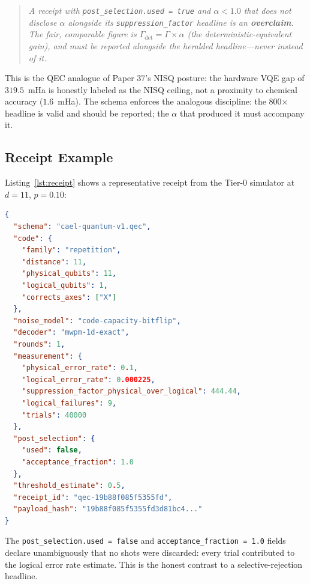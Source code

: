 \documentclass[conference]{IEEEtran}
\providecommand{\measuredFrom}[1]{}
\newcommand{\af}{\alpha}            %
\newcommand{\suppfactor}{\Gamma}    %
\begin{document}
\begin{quote}
\textit{A receipt with \texttt{post\_selection.used = true} and
$\af < 1.0$ that does not disclose $\af$ alongside its
\texttt{suppression\_factor} headline is an \textbf{overclaim}.
The fair, comparable figure is $\suppfactor_{\mathrm{det}} = \suppfactor \times \af$
(the deterministic-equivalent gain), and must be reported alongside
the heralded headline---never instead of it.}
\end{quote}

This is the QEC analogue of Paper 37's NISQ posture: the hardware VQE
gap of $319.5$~mHa is honestly labeled as the NISQ ceiling, not a
proximity to chemical accuracy ($1.6$~mHa). The schema enforces the
analogous discipline: the 800$\times$ headline is valid and should be
reported; the $\af$ that produced it must accompany it.

\subsection{Receipt Example}

Listing~\ref{lst:receipt} shows a representative receipt from the Tier-0
simulator at $d{=}11$, $p{=}0.10$:
\measuredFrom{.ai-ecosystem/scripts/quantum-scaleup/receipts/2026-06-15_qec-threshold-repetition.ndjson}

\begin{lstlisting}[language=JSON,caption={Example \texttt{cael-quantum-v1.qec} receipt at $d=11$, $p=0.10$},label=lst:receipt]
{
  "schema": "cael-quantum-v1.qec",
  "code": {
    "family": "repetition",
    "distance": 11,
    "physical_qubits": 11,
    "logical_qubits": 1,
    "corrects_axes": ["X"]
  },
  "noise_model": "code-capacity-bitflip",
  "decoder": "mwpm-1d-exact",
  "rounds": 1,
  "measurement": {
    "physical_error_rate": 0.1,
    "logical_error_rate": 0.000225,
    "suppression_factor_physical_over_logical": 444.44,
    "logical_failures": 9,
    "trials": 40000
  },
  "post_selection": {
    "used": false,
    "acceptance_fraction": 1.0
  },
  "threshold_estimate": 0.5,
  "receipt_id": "qec-19b88f085f5355fd",
  "payload_hash": "19b88f085f5355fd3d81bc4..."
}
\end{lstlisting}

The \texttt{post\_selection.used = false} and
\texttt{acceptance\_fraction = 1.0} fields declare unambiguously that no
shots were discarded: every trial contributed to the logical error rate
estimate. This is the honest contrast to a selective-rejection headline.
\end{document}
